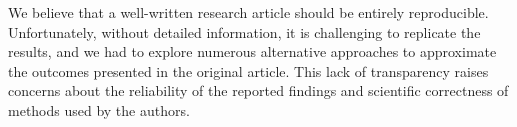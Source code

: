 We believe that a well-written research article should be entirely reproducible. Unfortunately, without detailed information, it is challenging to replicate the results, and we had to explore numerous alternative approaches to approximate the outcomes presented in the original article. This lack of transparency raises concerns about the reliability of the reported findings and scientific correctness of methods used by the authors.